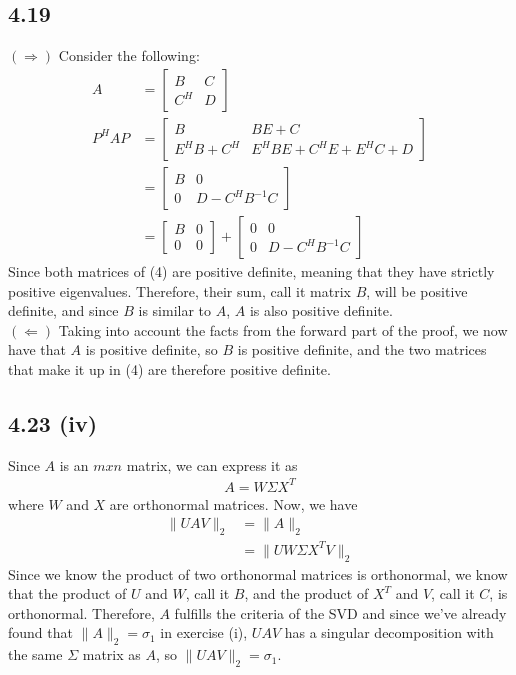\documentclass[letterpaper,12pt]{article}
\theoremstyle{definition}
\begin{document}
\subsection*{4.19}
$(\Rightarrow)$ Consider the following:
\begin{align}
A &= \begin{bmatrix}
B & C \\ 
C^H & D
\end{bmatrix}\\
P^HAP &= \begin{bmatrix}
B & BE + C \\
E^HB +C^H & E^HBE + C^HE + E^HC + D
\end{bmatrix}\\
&=\begin{bmatrix}
B & 0\\
0 & D - C^HB^{-1}C
\end{bmatrix}\\
&= \begin{bmatrix}
B&0\\
0 &0
\end{bmatrix}
+
\begin{bmatrix}
0&0\\
0 & D-C^HB^{-1}C
\end{bmatrix}
\end{align}
Since both matrices of (4) are positive definite, meaning that they have strictly positive eigenvalues. Therefore, their sum, call it matrix $B$, will be positive definite, and since $B$ is similar to $A$, $A$ is also positive definite.\\
$(\Leftarrow)$ Taking into account the facts from the forward part of the proof, we now have that $A$ is positive definite, so $B$ is positive definite, and the two matrices that make it up in (4) are therefore positive definite.

\subsection*{4.23 (iv)}
Since $A$ is an $mxn$ matrix, we can express it as 
\begin{align*}
    A = W\Sigma X^T
\end{align*}
where $W$ and $X$ are orthonormal matrices. Now, we have
\begin{align*}
    \|UAV\|_2 &= \|A\|_2\\
    &= \|UW\Sigma X^TV\|_2 
\end{align*}
Since we know the product of two orthonormal matrices is orthonormal, we know that the product of $U$ and $W$, call it $B$, and the product of $X^T$ and $V$, call it $C$, is orthonormal. Therefore, $A$ fulfills the criteria of the SVD and since we've already found that $\|A\|_2 = \sigma_1$ in exercise (i), $UAV$ has a singular decomposition with the same $\Sigma$ matrix as $A$, so $\|UAV\|_2 = \sigma_1$.
\end{document}
